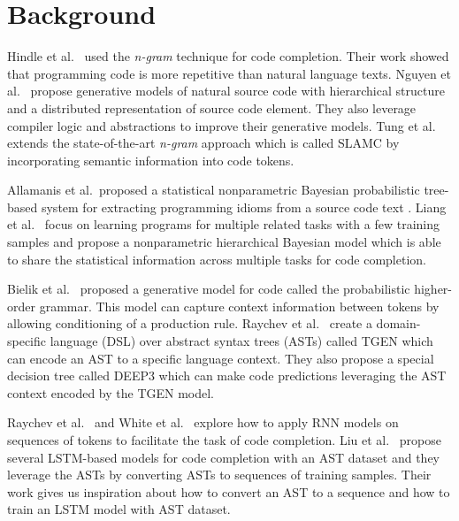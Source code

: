 \documentclass[E]{compsoft}
\begin{document}
\section{Background}
Hindle et al.\  \cite{hindle2012naturalness} used the \textit{n-gram} technique for code completion.  Their work showed that programming code is more repetitive than natural language texts.
Nguyen et al.\  \cite{DBLP:journals/corr/MaddisonT14} propose generative models of natural source code with hierarchical structure and a distributed representation of source code element. 
They also leverage compiler logic and abstractions to improve their generative models.
Tung et al.\  \cite{Nguyen:2013:SSL:2491411.2491458} extends the state-of-the-art \textit{n-gram} approach which is called SLAMC by incorporating semantic information into code tokens. 

Allamanis et al.\ proposed a statistical nonparametric Bayesian probabilistic tree-based system for extracting programming idioms from a source code text
\cite{allamanis2014mining}.
Liang et al.\  \cite{liang2010learning} focus on learning programs for multiple related tasks with a few training samples and propose a nonparametric hierarchical Bayesian model which is able to share the statistical information across multiple tasks for code completion.

Bielik et al.\  \cite{bielik2016phog} proposed a generative model for code called the probabilistic higher-order grammar. This model can capture context information between tokens by allowing conditioning of a production rule. 
Raychev et al.\  \cite{raychev2016probabilistic} create a domain-specific language (DSL) over abstract syntax trees (ASTs) called TGEN which can encode an AST to a specific language context.
They also propose a special decision tree called DEEP3 which can make code predictions leveraging the AST context encoded by the TGEN model.

Raychev et al.\  \cite{raychev2014code} and White et al.\  \cite{white2015toward} explore how to apply RNN models on sequences of tokens to facilitate the task of code completion.
Liu et al.\  \cite{liu2016neural} propose several LSTM-based models for code completion with an AST dataset and they leverage the ASTs by converting ASTs to sequences of training samples. 
Their work gives us inspiration about how to convert an AST to a sequence and how to train an LSTM model with AST dataset. 
\end{document}
